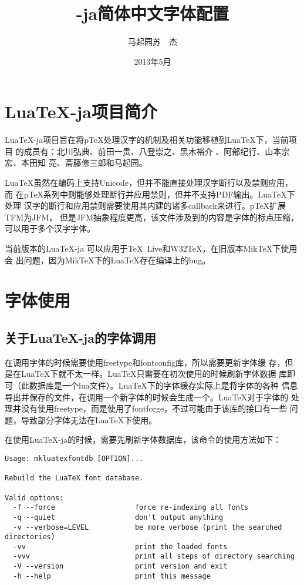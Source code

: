\documentclass[DIV=13]{article}
\title{\textbf{\LuaTeX-ja简体中文字体配置}}
\author{马起园\hskip2.5\zw 苏　杰}
\date{2013年5月}
\def\pTeX{p\TeX}
\def\LuaTeX{Lua\TeX}
\def\XeTeX{\hologo{XeTeX}}
\begin{document}
\maketitle
\section{\LuaTeX-ja项目简介}
\LuaTeX-ja项目旨在将\pTeX 处理汉字的机制及相关功能移植到\LuaTeX 下，当前项目
的成员有：北川弘典、前田一贵、八登崇之、黑木裕介 、阿部纪行、山本宗宏、本田知
亮、斋藤修三郎和马起园。

\LuaTeX 虽然在编码上支持Unicode，但并不能直接处理汉字断行以及禁则应用，而
在\pTeX 系列中则能够处理断行并应用禁则，但并不支持PDF输出。\LuaTeX 下处理
汉字的断行和应用禁则需要使用其内建的诸多callback来进行。\pTeX 扩展TFM为JFM，
但是JFM抽象程度更高，该文件涉及到的内容是字体的标点压缩，可以用于多个汉字字体。

当前版本的\LuaTeX-ja 可以应用于\TeX\ Live和W32\TeX，在旧版本MikTeX下使用会
出问题，因为MikTeX下的\LuaTeX 存在编译上的bug。

\section{字体使用}

\subsection{关于\LuaTeX-ja的字体调用}

\XeTeX 在调用字体的时候需要使用freetype和fontconfig库，所以需要更新字体缓
存，但是在\LuaTeX 下就不太一样。\LuaTeX 只需要在初次使用的时候刷新字体数据
库即可（此数据库是一个lua文件）。\LuaTeX 下的字体缓存实际上是将字体的各种
信息导出并保存的文件，在调用一个新字体的时候会生成一个。\LuaTeX 对于字体的
处理并没有使用freetype，而是使用了fontforge，不过可能由于该库的接口有一些
问题，导致部分字体无法在\LuaTeX 下使用。

在使用\LuaTeX-ja的时候，需要先刷新字体数据库，该命令的使用方法如下：
\begin{verbatim}
Usage: mkluatexfontdb [OPTION]...
    
Rebuild the LuaTeX font database.

Valid options:
  -f --force                   force re-indexing all fonts
  -q --quiet                   don't output anything
  -v --verbose=LEVEL           be more verbose (print the searched directories)
  -vv                          print the loaded fonts
  -vvv                         print all steps of directory searching
  -V --version                 print version and exit
  -h --help                    print this message
\end{verbatim}
\end{document}
